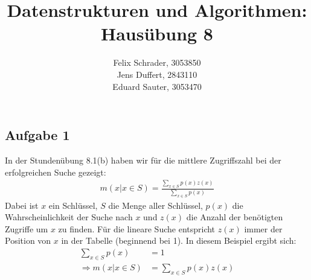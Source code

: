 \documentclass[11pt]{article}
\author{
  Felix Schrader, 3053850 \\ 
  Jens Duffert, 2843110 \\
  Eduard Sauter, 3053470
}
\title{Datenstrukturen und Algorithmen: Haus\"ubung 8}
\begin{document}
\maketitle
\subsection*{Aufgabe 1}
  In der Stundenübung 8.1(b) haben wir für die mittlere Zugriffszahl bei der
  erfolgreichen Suche gezeigt:
  \begin{align*}
    m(x \vert x \in S) = \frac{\sum_{x \in S} p(x) z(x)}{\sum_{x \in S} p(x)}
  \end{align*}
  Dabei ist $x$ ein Schlüssel, $S$ die Menge aller Schlüssel, $p(x)$ die
  Wahrscheinlichkeit der Suche nach $x$ und $z(x)$ die Anzahl der benötigten
  Zugriffe um $x$ zu finden. Für die lineare Suche entspricht $z(x)$ immer der
  Position von $x$ in der Tabelle (beginnend bei 1). In diesem Beispiel ergibt
  sich:
  \begin{align*}
    \sum_{x \in S} p(x) &= 1 \\
    \Rightarrow m(x \vert x \in S) &= \sum_{x \in S} p(x) z(x)
  \end{align*}
\end{document}

